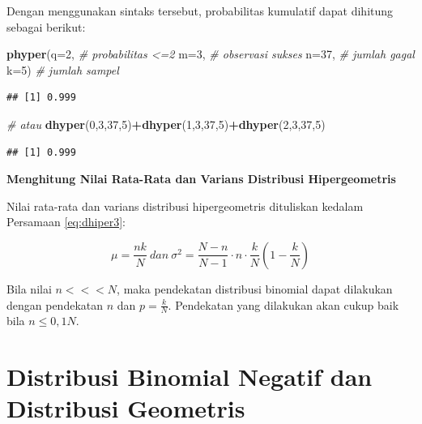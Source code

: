 \documentclass[]{book}
\newenvironment{Shaded}{\begin{snugshade}}{\end{snugshade}}
\newcommand{\KeywordTok}[1]{\textcolor[rgb]{0.13,0.29,0.53}{\textbf{#1}}}
\newcommand{\DataTypeTok}[1]{\textcolor[rgb]{0.13,0.29,0.53}{#1}}
\newcommand{\DecValTok}[1]{\textcolor[rgb]{0.00,0.00,0.81}{#1}}
\newcommand{\CommentTok}[1]{\textcolor[rgb]{0.56,0.35,0.01}{\textit{#1}}}
\newcommand{\OperatorTok}[1]{\textcolor[rgb]{0.81,0.36,0.00}{\textbf{#1}}}
\newcommand{\NormalTok}[1]{#1}
\begin{document}
Dengan menggunakan sintaks tersebut, probabilitas kumulatif dapat
dihitung sebagai berikut:

\begin{Shaded}
\begin{Highlighting}[]
\KeywordTok{phyper}\NormalTok{(}\DataTypeTok{q=}\DecValTok{2}\NormalTok{, }\CommentTok{# probabilitas <=2}
       \DataTypeTok{m=}\DecValTok{3}\NormalTok{, }\CommentTok{# observasi sukses}
       \DataTypeTok{n=}\DecValTok{37}\NormalTok{, }\CommentTok{# jumlah gagal}
       \DataTypeTok{k=}\DecValTok{5}\NormalTok{) }\CommentTok{# jumlah sampel}
\end{Highlighting}
\end{Shaded}

\begin{verbatim}
## [1] 0.999
\end{verbatim}

\begin{Shaded}
\begin{Highlighting}[]
\CommentTok{# atau}
\KeywordTok{dhyper}\NormalTok{(}\DecValTok{0}\NormalTok{,}\DecValTok{3}\NormalTok{,}\DecValTok{37}\NormalTok{,}\DecValTok{5}\NormalTok{)}\OperatorTok{+}\KeywordTok{dhyper}\NormalTok{(}\DecValTok{1}\NormalTok{,}\DecValTok{3}\NormalTok{,}\DecValTok{37}\NormalTok{,}\DecValTok{5}\NormalTok{)}\OperatorTok{+}\KeywordTok{dhyper}\NormalTok{(}\DecValTok{2}\NormalTok{,}\DecValTok{3}\NormalTok{,}\DecValTok{37}\NormalTok{,}\DecValTok{5}\NormalTok{)}
\end{Highlighting}
\end{Shaded}

\begin{verbatim}
## [1] 0.999
\end{verbatim}

\textbf{Menghitung Nilai Rata-Rata dan Varians Distribusi
Hipergeometris}

Nilai rata-rata dan varians distribusi hipergeometris dituliskan kedalam
Persamaan \eqref{eq:dhiper3}:

\begin{equation}
   \mu=\frac{nk}{N}\ dan\ \sigma^2=\frac{N-n}{N-1}\cdot n\cdot\frac{k}{N}\left(1-\frac{k}{N}\right)
  \label{eq:dhiper3}
\end{equation}

Bila nilai \(n<<<N\), maka pendekatan distribusi binomial dapat
dilakukan dengan pendekatan \(n\) dan \(p=\frac{k}{N}\). Pendekatan yang
dilakukan akan cukup baik bila \(n\le0,1N\).

\section{Distribusi Binomial Negatif dan Distribusi
Geometris}\label{distribusi-binomial-negatif-dan-distribusi-geometris}
\end{document}
